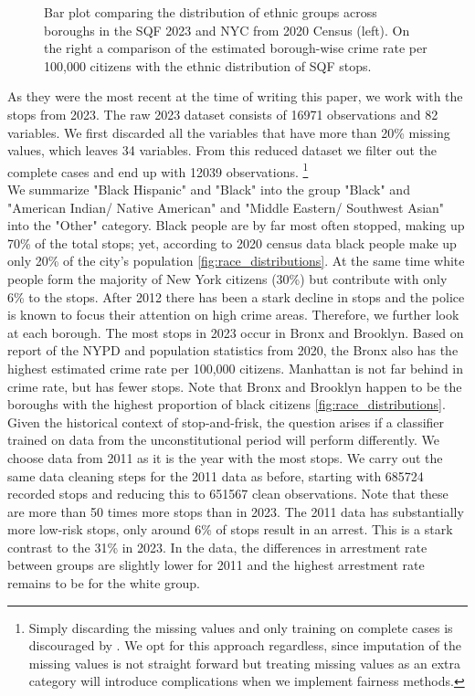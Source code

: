 \begin{figure}
\begin{minipage}{0.49\textwidth}
  \end{minipage}
  \caption{Bar plot comparing the distribution of ethnic groups across boroughs in the SQF 2023 and NYC from 2020 Census (left). On the right a comparison of the estimated borough-wise crime rate per 100,000 citizens with the ethnic distribution of SQF stops.}
  \label{fig:race_distributions}
\end{figure}

As they were the most recent at the time of writing this paper, we work with the stops from 2023. The raw 2023 dataset consists of 16971 observations and 82 variables. We first discarded all the variables that have more than 20\% missing values, which leaves 34 variables.
From this reduced dataset we filter out the complete cases and end up with 12039 observations. \footnote{Simply discarding the missing values and only training on complete cases is discouraged by \cite{fernando2021}. We opt for this approach regardless, since imputation of the missing values is not straight forward
but treating missing values as an extra category will introduce complications when we implement fairness methods.} \\

We summarize "Black Hispanic" and "Black" into the group "Black" and  "American Indian/ Native American" and "Middle Eastern/ Southwest Asian" into the "Other" category. Black people are by far most often stopped, making up 70\% of the total stops; yet, according to 2020 census data black people make up only 20\% of the city's population \autoref{fig:race_distributions}. At the same time white people form the majority of New York citizens (30\%) but contribute with only 6\% to the stops. 
After 2012 there has been a stark decline in stops and the police is known to focus their attention on high crime areas. Therefore, we further look at each borough. 
The most stops in 2023 occur in Bronx and Brooklyn. Based on report of the NYPD and population statistics from 2020, the Bronx also has the highest estimated crime rate per 100,000 citizens. Manhattan is not far behind in crime rate, but has fewer stops. Note that Bronx and Brooklyn happen to be the boroughs with the highest proportion of black citizens \autoref{fig:race_distributions}.\\

  
Given the historical context of stop-and-frisk, the question arises if a classifier trained on data from the unconstitutional period will perform differently.
We choose data from 2011 as it is the year with the most stops. We carry out the same data cleaning steps for the 2011 data as before, starting with 685724 recorded stops and reducing this to 651567 clean observations. Note that these are more than 50 times more stops than in 2023.
The 2011 data has substantially more low-risk stops, only around 6\% of stops result in an arrest. This is a stark contrast to the 31\% in 2023. In the data, the differences in arrestment rate between groups are slightly lower for 2011 and the highest arrestment rate remains to be for the white group.\\

